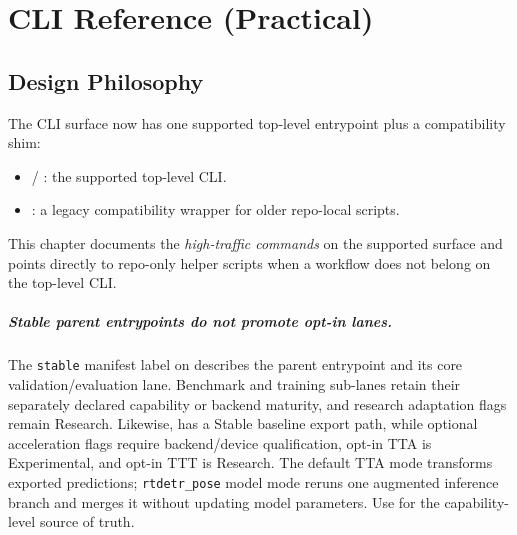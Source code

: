 \chapter{CLI Reference (Practical)}
\label{chap:cli-reference}



\section{Design Philosophy}
The CLI surface now has one supported top-level entrypoint plus a compatibility shim:
\begin{itemize}
  \item {} / : the supported top-level CLI.
  \item {}: a legacy compatibility wrapper for older repo-local scripts.
\end{itemize}

This chapter documents the \textit{high-traffic commands} on the supported surface and points directly to repo-only helper scripts when a workflow does not belong on the top-level CLI.

\paragraph{Stable parent entrypoints do not promote opt-in lanes.}
The \texttt{stable} manifest label on  describes the parent
entrypoint and its core validation/evaluation lane. Benchmark and training
sub-lanes retain their separately declared capability or backend maturity, and
research adaptation flags remain Research.
Likewise,  has a Stable baseline export path,
while optional acceleration flags require backend/device qualification,
opt-in TTA is Experimental, and opt-in TTT is Research. The default TTA mode
transforms exported predictions; \texttt{rtdetr\_pose} model mode reruns one
augmented inference branch and merges it without updating model parameters. Use
 for the capability-level source of truth.


